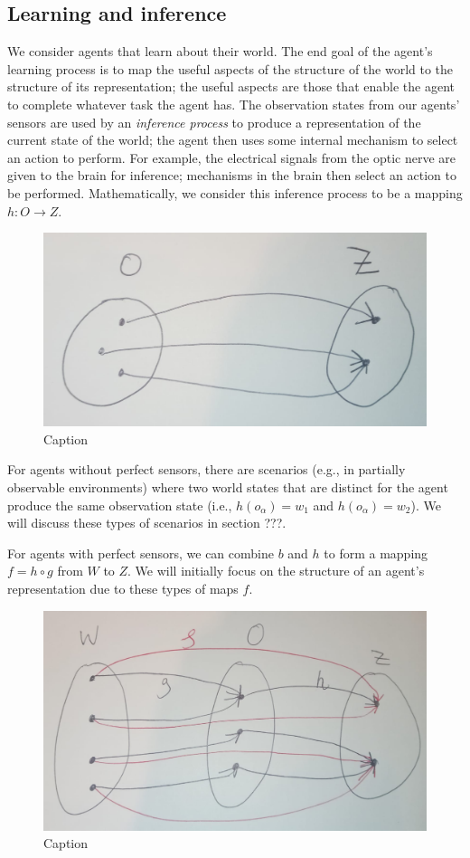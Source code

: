 \subsection{Learning and inference}

We consider agents that learn about their world.
The end goal of the agent’s learning process is to map the useful aspects of the structure of the world to the structure of its representation; the useful aspects are those that enable the agent to complete whatever task the agent has.
The observation states from our agents' sensors are used by an \emph{inference process} to produce a representation of the current state of the world; the agent
then uses some internal mechanism to select an action to perform.
For example, the electrical signals from the optic nerve are given to the brain for inference; mechanisms in the brain then select an action to be performed. 
Mathematically, we consider this inference process to be a mapping $h: O \to Z$.
\begin{figure}
    \centering
    \includegraphics[width=0.5\linewidth]{2MathematicalFramework/InitialFramework/Images/inference_process_O_to_Z.jpeg}
    \caption{Caption}
    \label{fig:inference_process_O_to_Z}
\end{figure}

For agents without perfect sensors, there are scenarios (e.g., in partially observable environments) where two world states that are distinct for the agent produce the same observation state (i.e., $h(o_{\alpha}) = w_{1}$ and $h(o_{\alpha}) = w_{2}$).
We will discuss these types of scenarios in section ???.

For agents with perfect sensors, we can combine $b$ and $h$ to form a mapping $f = h \circ g$ from $W$ to $Z$.
We will initially focus on the structure of an agent's representation due to these types of maps $f$.
\begin{figure}
    \centering
    \includegraphics[width=0.5\linewidth]{2MathematicalFramework/InitialFramework/Images/W_to_Z.jpeg}
    \caption{Caption}
    \label{fig:W_to_Z}
\end{figure}


